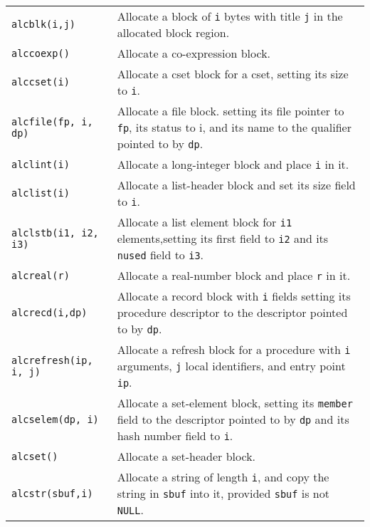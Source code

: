 {\renewcommand{\arraystretch}{1}%
\begin{xtabular}{>{\hspace{1cm}\texttt\bgroup}l<{\egroup}@{\hspace{1cm}}p{11cm}}

alcblk(i,j) &
Allocate a block of \texttt{i} bytes with title \texttt{j} in the allocated
block region.\\

alccoexp() &
Allocate a co-expression block.\\

alccset(i) &
Allocate a cset block for a cset, setting its size to \texttt{i}.\\

alcfile(fp, i, dp) &
Allocate a file block. setting its file pointer to \texttt{fp}, its status to
i, and its name to the qualifier pointed to by \texttt{dp}.\\

alclint(i) &
Allocate a long-integer block and place \texttt{i} in it.\\

alclist(i) &
Allocate a list-header block and set its size field to \texttt{i}.\\

alclstb(i1, i2, i3) &
Allocate a list element block for \texttt{i1} elements,setting its first field
to \texttt{i2} and its \texttt{nused} field to \texttt{i3}.\\

alcreal(r) &
Allocate a real-number block and place \texttt{r} in it.\\

alcrecd(i,dp) &
Allocate a record block with \texttt{i} fields setting its procedure descriptor
to the descriptor pointed to by \texttt{dp}.\\

alcrefresh(ip, i, j) &
Allocate a refresh block for a procedure with \texttt{i} arguments, \texttt{j}
local identifiers, and entry point \texttt{ip}.\\

alcselem(dp, i) &
Allocate a set-element block, setting its \texttt{member} field to the descriptor
pointed to by \texttt{dp} and its hash number field to \texttt{i}.\\

alcset() &
Allocate a set-header block.\\

alcstr(sbuf,i) &
Allocate a string of length \texttt{i}, and copy the string in \texttt{sbuf} into
it, provided \texttt{sbuf} is not \texttt{NULL}.\\


\end{xtabular}}
